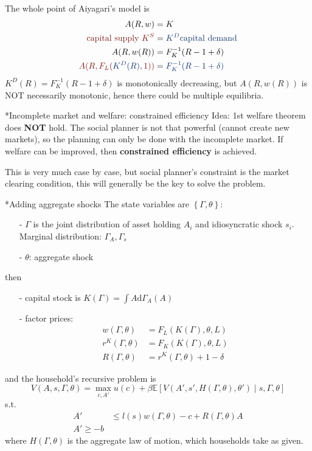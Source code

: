 \documentclass[10pt,landscape,a4paper]{article}
\makeatletter
\renewcommand{\subsection}{\@startsection{subsection}{1}{0mm}{.2ex}{.2ex}{\small\bfseries}}
\makeatother
\begin{document}
\begin{multicols*}{3}
The whole point of Aiyagari's model is 
\begin{align*}
    A(R,w) &= K\\
    \text{\color{myred}capital supply }{\color{myred}K^S} &={\color{myblue}K^D} \text{\color{myblue} capital demand}\\
    A(R,w(R)) &= F_K^{-1}(R-1+\delta)\\
    {\color{myred}A(R,F_L(}{\color{myblue}K^D(R)}{\color{myred},1))} &= {\color{myblue}F_K^{-1}(R-1+\delta)}
\end{align*}
$K^D(R)=F_K^{-1}(R-1+\delta)$ is monotonically decreasing, but $A(R,w(R))$ is NOT necessarily monotonic, hence there could be multiple equilibria.

\subsection*{Incomplete market and welfare: constrained efficiency}
Idea: 1st welfare theorem does \textbf{NOT} hold. The social planner is not that powerful (cannot create new markets), so the planning can only be done with the incomplete market. If welfare can be improved, then \textbf{constrained efficiency} is achieved.

This is very much case by case, but social planner's constraint is the market clearing condition, this will generally be the key to solve the problem.

\subsection*{Adding aggregate shocks}
The state variables are $\left\{\Gamma,\theta\right\}$:
\begin{itemize}
    \item[-] $\Gamma$ is the joint distribution of asset holding $A_i$ and idiosyncratic shock $s_i$. Marginal distribution: $\Gamma_A,\Gamma_s$
    \item[-] $\theta$: aggregate shock
\end{itemize}
then 
\begin{itemize}
    \item[-] capital stock is $K(\Gamma)=\int A\mathrm{d}\Gamma_A(A)$
    \item[-] factor prices:
    \begin{align*}
        w(\Gamma,\theta)&=F_L(K(\Gamma),\theta,L)\\
        r^K(\Gamma,\theta)&=F_K(K(\Gamma),\theta,L)\\
        R(\Gamma,\theta)&=r^K(\Gamma,\theta)+1-\delta
    \end{align*}
\end{itemize}
and the household's recursive problem is
$$
V(A,s,\Gamma,\theta) = \max_{c,A'}u(c)+\beta\mathbb{E}\left[ V(A',s',H(\Gamma,\theta),\theta')\mid s,\Gamma,\theta \right]
$$
s.t.
\begin{align*}
    A' &\leq l(s)w(\Gamma,\theta)-c +R(\Gamma,\theta)A\\
    A'\geq -b
\end{align*}
where $H(\Gamma,\theta)$ is the aggregate law of motion, which households take as given.


\end{multicols*}
\end{document}
